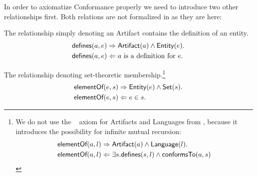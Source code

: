 In order to axiomatize \gls{Conformance} properly we need to introduce two other relationships first.
Both relations are not formalized in \cite{DBLP:conf/modelsward/HeinzLV17} as they are here:
\begin{description}[align=left]
\item[\defines]
The relationship simply denoting an \gls{Artifact} contains the definition of an entity.
\begin{align*}
\textsf{defines}(a,e)
&\Rightarrow
\textsf{Artifact}(a) \wedge \textsf{Entity}(e).\\
\textsf{defines}(a,e)
&\Leftarrow
a \text{ is a definition for } e.
\end{align*}

\item[\elementOf]
The relationship denoting set-theoretic membership.\footnote{We do not use the \elementOf~ axiom for \glspl{Artifact} and \glspl{Language} from \cite{DBLP:conf/modelsward/HeinzLV17}, because it introduces the possibility for infinite mutual recursion:
\begin{align*}
\textsf{elementOf}(a,l)
&\Rightarrow
\textsf{Artifact}(a) \wedge \textsf{Language}(l).\\
\textsf{elementOf}(a,l)
&\Leftarrow
\exists s.\textsf{defines}(s,l) \wedge \textsf{conformsTo}(a,s)
\end{align*}}
\begin{align*}
\textsf{elementOf}(e,s)
&\Rightarrow
\textsf{Entity}(e) \wedge \textsf{Set}(s).\\
\textsf{elementOf}(e,s)
&\Leftarrow
e \in s.
\end{align*}


\end{description}


